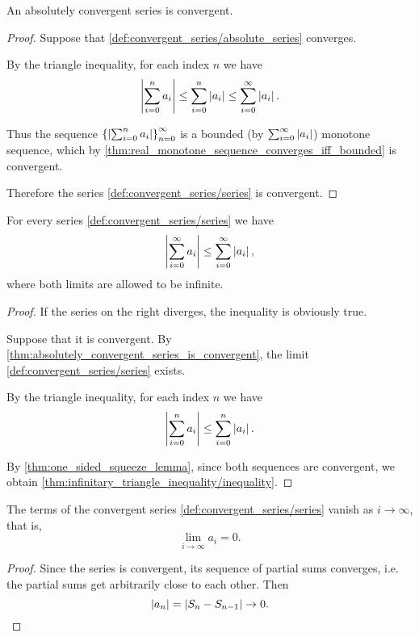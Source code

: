 \begin{proposition}\label{thm:absolutely_convergent_series_is_convergent}
  An absolutely convergent series is convergent.
\end{proposition}
\begin{proof}
  Suppose that \cref{def:convergent_series/absolute_series} converges.

  By the triangle inequality, for each index \( n \) we have
  \begin{equation*}
    \left\vert \sum_{i=0}^n a_i \right\vert \leq \sum_{i=0}^n \left\vert a_i \right\vert \leq \sum_{i=0}^\infty \left\vert a_i \right\vert.
  \end{equation*}

  Thus the sequence \( \left\{ \left\vert \sum_{i=0}^{n} a_i \right\vert \right\}_{n=0}^\infty \) is a bounded (by \( \sum_{i=0}^\infty \left\vert a_i \right\vert \)) monotone sequence, which by \cref{thm:real_monotone_sequence_converges_iff_bounded} is convergent.

  Therefore the series \cref{def:convergent_series/series} is convergent.
\end{proof}

\begin{proposition}\label{thm:infinitary_triangle_inequality}
  For every series \cref{def:convergent_series/series} we have
  \begin{equation}\label{thm:infinitary_triangle_inequality/inequality}
    \left\vert \sum_{i=0}^\infty a_i \right\vert \leq \sum_{i=0}^\infty \left\vert a_i \right\vert,
  \end{equation}
  where both limits are allowed to be infinite.
\end{proposition}
\begin{proof}
  If the series on the right diverges, the inequality is obviously true.

  Suppose that it is convergent. By \cref{thm:absolutely_convergent_series_is_convergent}, the limit
  \cref{def:convergent_series/series} exists.

  By the triangle inequality, for each index \( n \) we have
  \begin{equation*}
    \left\vert \sum_{i=0}^n a_i \right\vert \leq \sum_{i=0}^n \left\vert a_i \right\vert.
  \end{equation*}

  By \cref{thm:one_sided_squeeze_lemma}, since both sequences are convergent, we obtain \cref{thm:infinitary_triangle_inequality/inequality}.
\end{proof}

\begin{proposition}\label{thm:convergent_series_terms_vanish}
  The terms of the convergent series \cref{def:convergent_series/series} vanish as \( i \to \infty \), that is,
  \begin{equation*}
    \lim_{i \to \infty} a_i = 0.
  \end{equation*}
\end{proposition}
\begin{proof}
  Since the series is convergent, its sequence of partial sums converges, i.e. the partial sums get arbitrarily close to each other. Then
  \begin{equation*}
    \left\vert a_n \right\vert = \left\vert S_n - S_{n-1} \right\vert \to 0.
  \end{equation*}
\end{proof}

